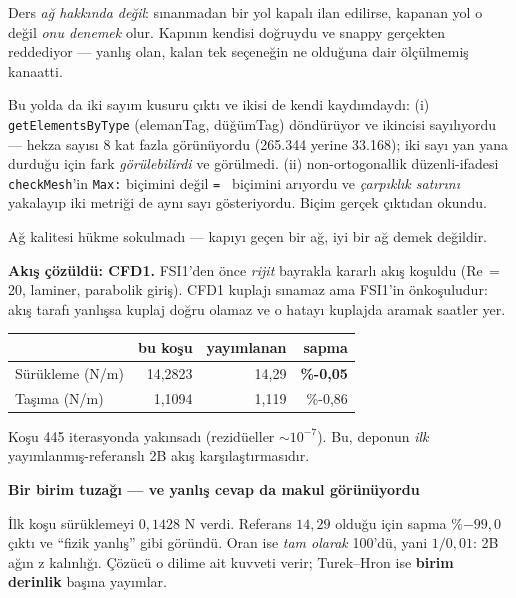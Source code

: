\documentclass[11pt,a4paper]{article}
\newcommand{\kkkenar}{lacivert}
\newcommand{\kkzemin}{kod}
\newenvironment{renkkutu}[3]{%
  \renewcommand{\kkkenar}{#1}\renewcommand{\kkzemin}{#2}%
  \par\medskip\noindent
  \begin{lrbox}{\kutugovde}%
  \begin{minipage}{\dimexpr\linewidth-2\fboxsep-2\fboxrule\relax}\footnotesize
  \textcolor{#1}{\textbf{#3}}\par\vspace{3pt}%
}{%
  \end{minipage}%
  \end{lrbox}%
  \noindent\fcolorbox{\kkkenar}{\kkzemin}{\usebox{\kutugovde}}%
  \par\medskip
}
\newenvironment{dikkat}[1]{\begin{renkkutu}{orta}{ortabg}{#1}}{\end{renkkutu}}
\begin{document}
\begin{description}
        \noindent Ders \emph{ağ hakkında değil}: sınanmadan bir yol kapalı
        ilan edilirse, kapanan yol o değil \emph{onu denemek} olur. Kapının
        kendisi doğruydu ve snappy gerçekten reddediyor --- yanlış olan,
        kalan tek seçeneğin ne olduğuna dair ölçülmemiş kanaatti.

        \noindent Bu yolda da iki sayım kusuru çıktı ve ikisi de kendi
        kaydımdaydı: (i) \texttt{getElementsByType} (elemanTag, düğümTag)
        döndürüyor ve ikincisi sayılıyordu --- hekza sayısı 8 kat fazla
        görünüyordu (265.344 yerine 33.168); iki sayı yan yana durduğu
        için fark \emph{görülebilirdi} ve görülmedi. (ii) non-ortogonallik
        düzenli-ifadesi \texttt{checkMesh}'in \texttt{Max:} biçimini değil
        \texttt{= } biçimini arıyordu ve \emph{çarpıklık satırını} yakalayıp iki
        metriği de aynı sayı gösteriyordu. Biçim gerçek çıktıdan okundu.

        \noindent Ağ kalitesi hükme sokulmadı --- kapıyı geçen bir ağ, iyi bir
        ağ demek değildir.

        \textbf{Akış çözüldü: CFD1.} FSI1'den önce \emph{rijit} bayrakla
        kararlı akış koşuldu (Re$\,{=}\,$20, laminer, parabolik giriş). CFD1
        kuplajı sınamaz ama FSI1'in önkoşuludur: akış tarafı yanlışsa kuplaj
        doğru olamaz ve o hatayı kuplajda aramak saatler yer.

\begin{center}\footnotesize
\begin{tabular}{@{}lrrr@{}}
\toprule
 & bu koşu & yayımlanan & sapma \\
\midrule
Sürükleme (N/m) & 14{,}2823 & 14{,}29 & \textbf{\%-0{,}05} \\
Taşıma (N/m) & 1{,}1094 & 1{,}119 & \%-0{,}86 \\
\bottomrule
\end{tabular}
\end{center}

        \noindent Koşu 445 iterasyonda yakınsadı (rezidüeller
        $\sim\!10^{-7}$). Bu, deponun \emph{ilk} yayımlanmış-referanslı 2B akış
        karşılaştırmasıdır.

        \begin{dikkat}{Bir birim tuzağı --- ve yanlış cevap da makul görünüyordu}
        İlk koşu sürüklemeyi $0{,}1428$ N verdi. Referans $14{,}29$ olduğu için
        sapma \%$-99{,}0$ çıktı ve ``fizik yanlış'' gibi göründü. Oran ise
        \emph{tam olarak} 100'dü, yani $1/0{,}01$: 2B ağın z kalınlığı. Çözücü
        o dilime ait kuvveti verir; Turek--Hron ise \textbf{birim derinlik}
        başına yayımlar.


\end{dikkat}
\end{description}
\end{document}

